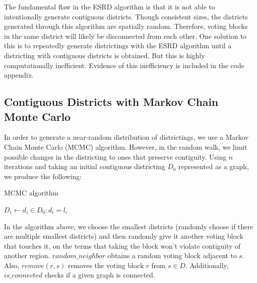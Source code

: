 \documentclass[12pt]{article}
\begin{document}
The fundamental flaw in the ESRD algorithm is that it is not able to intentionally generate contiguous districts. Though consistent sizes, the districts generated through this algorithm are spatially random. Therefore, voting blocks in the same district will likely be disconnected from each other. One solution to this is to repeatedly generate districtings with the ESRD algorithm until a districting with contiguous districts is obtained. But this is highly computationally inefficient. Evidence of this inefficiency is included in the code appendix.
\subsection{Contiguous Districts with Markov Chain Monte Carlo}
In order to generate a near-random distribution of districtings, we use a Markov Chain Monte Carlo (MCMC) algorithm. However, in the random walk, we limit possible changes in the districting to ones that preserve contiguity. Using \(n\) iterations and taking an initial contiguous districting \(D_0\) represented as a graph, we produce the following:

\begin{algorithm}
\caption{MCMC algorithm}\label{alg:mcmc}
\begin{algorithmic}[]
 
        \State $D_i \gets {d_i \in D_0 : d_i= l_i}$
\EndFor
{}
    \EndIf
    \EndFor
\EndWhile
\EndProcedure
\end{algorithmic}
\end{algorithm}
In the algorithm above, we choose the smallest districts (randomly choose if there are multiple smallest districts) and then randomly give it another voting block that touches it, on the terms that taking the block won't violate contiguity of another region. $random\_neighbor$ obtains a random voting block adjacent to \(s\). Also, $remove(r, s)$ removes the voting block $r$ from $s \in D$. Additionally, $is\_connected$ checks if a given graph is connected.
\end{document}
